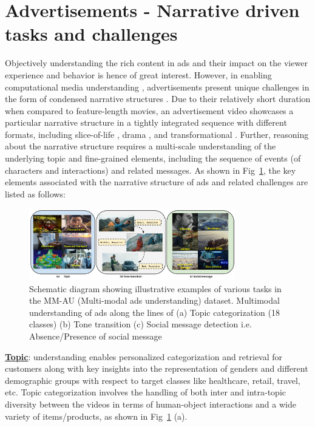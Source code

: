 \section{Advertisements - Narrative driven tasks and challenges}

Objectively understanding the rich content in ads and their impact on the viewer experience and behavior is hence of great interest. However, in enabling computational media understanding \cite{CMI}, advertisements present unique challenges in the form of condensed narrative structures \cite{Kim2017WhyNA}. Due to their relatively short duration when compared to feature-length movies, an advertisement video showcases a particular narrative structure in a tightly integrated sequence with different formats, including slice-of-life \cite{Mick1987TowardAS}, drama \cite{Leong1994UsingDT}, and transformational \cite{Puto1984InformationalAT}. Further, reasoning about the narrative structure requires a multi-scale understanding of the underlying topic and fine-grained elements, including the sequence of events (of characters and interactions) and related messages. As shown in Fig~\ref{introfig}, the key elements associated with the narrative structure of ads and related challenges are listed as follows:

\begin{figure}[h!]
\centering 
    \includegraphics[width=0.8\textwidth]{figures/Task_outline_1_Topic_TT_SM.pdf}
  \caption{Schematic diagram showing illustrative examples of various tasks in the MM-AU (Multi-modal ads understanding) dataset. Multimodal understanding of ads along the lines of (a) Topic categorization (18 classes) (b) Tone transition (c) Social message detection i.e. Absence/Presence of social message}
  \label{introfig}
\end{figure}

\textbf{\underline{Topic}}: understanding enables personalized categorization and retrieval for customers along with key insights into the representation of genders \cite{google-diversity} and different demographic groups with respect to target classes like healthcare, retail, travel, etc. Topic categorization involves the handling of both inter and intra-topic diversity between the videos in terms of human-object interactions and a wide variety of items/products, as shown in Fig~\ref{introfig} (a). 

